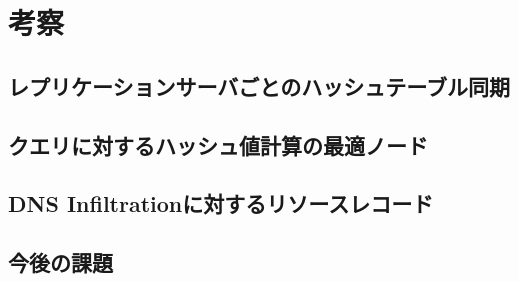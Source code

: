 \section{考察}
\subsection{レプリケーションサーバごとのハッシュテーブル同期}
\subsection{クエリに対するハッシュ値計算の最適ノード}
\subsection{DNS Infiltrationに対するリソースレコード}
\subsection{今後の課題}
